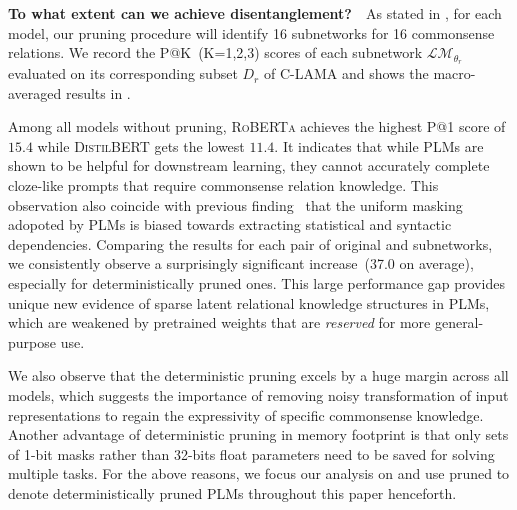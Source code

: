 \noindent
\textbf{To what extent can we achieve disentanglement?}~~As stated in , for each model, our pruning procedure will identify 16 subnetworks for 16 commonsense relations. We record the P@K~(K=1,2,3) scores of each subnetwork $\mathcal{LM}_{\theta_r}$ evaluated on its corresponding subset $D_r$ of C-LAMA and shows the macro-averaged results in . 

Among all models without pruning, \textsc{RoBERTa} achieves the highest P@1 score of $15.4$ while \textsc{DistilBERT} gets the lowest $11.4$. It indicates that while PLMs are shown to be helpful for downstream learning, they cannot accurately complete cloze-like prompts that require commonsense relation knowledge. This observation also coincide with previous finding~\citep{inductivemlm} that the uniform masking adopoted by PLMs is biased towards extracting statistical and syntactic dependencies. 
Comparing the results for each pair of original and subnetworks, we consistently observe a surprisingly significant increase~(37.0 on average), especially for deterministically pruned ones. This large performance gap provides unique new evidence of sparse latent relational knowledge structures in PLMs, which are weakened by pretrained weights that are \textit{reserved} for more general-purpose use. 

We also observe that the deterministic pruning excels by a huge margin 
across all models, which suggests the importance of removing noisy 
transformation of input representations to regain the expressivity of specific 
commonsense knowledge. Another advantage of deterministic pruning in memory 
footprint is that only sets of 1-bit masks rather than 32-bits float parameters 
need to be saved for solving multiple tasks. For the above reasons, 
we focus our analysis on and use \textsf{pruned} to denote deterministically 
pruned PLMs throughout this paper henceforth. 


